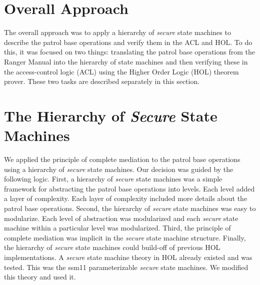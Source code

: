 
\section{Overall Approach}
\label{sec:overall-approach}

The overall approach was to apply a hierarchy of \emph{secure} state machines to describe the patrol
base operations and verify them in the ACL and HOL.  To do this, it was focused on two things:
translating the patrol base operations from the Ranger Manual \cite{rangerhandbook} into the hierarchy of state machines
and then verifying these in the access-control logic (ACL) using the Higher Order Logic (HOL)
theorem prover.  These two tasks are described separately in this section.

\section{The Hierarchy of \emph{Secure} State Machines}
\label{sec:hier-emphs-state}

We applied the principle of complete mediation to the patrol base operations using a hierarchy
of \emph{secure} state machines.  Our decision was guided by the following logic.  First, a hierarchy
of \emph{secure} state machines was a simple framework for abstracting the patrol base operations into
levels.  Each level added a layer of complexity.   Each layer of complexity included more details
about the patrol base operations.  Second, the hierarchy of \emph{secure} state machines was easy to
modularize.  Each level of abstraction was modularized and each \emph{secure} state machine within a
particular level was modularized.  Third, the principle of complete mediation was implicit in
the \emph{secure} state machine structure.    Finally, the hierarchy of \emph{secure} state machines could
build-off of previous HOL implementations.  A \emph{secure} state machine theory in HOL already existed
and was tested.   This was the ssm11 parameterizable \emph{secure} state machines.  We modified this
theory and used it.  \\

